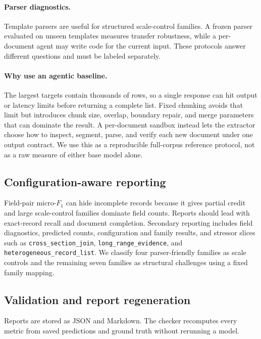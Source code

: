 \paragraph{Parser diagnostics.}
Template parsers are useful for structured scale-control families. A frozen parser evaluated on unseen templates measures transfer robustness, while a per-document agent may write code for the current input. These protocols answer different questions and must be labeled separately.

\paragraph{Why use an agentic baseline.}
The largest targets contain thousands of rows, so a single response can hit output or latency limits before returning a complete list. Fixed chunking avoids that limit but introduces chunk size, overlap, boundary repair, and merge parameters that can dominate the result. A per-document sandbox instead lets the extractor choose how to inspect, segment, parse, and verify each new document under one output contract. We use this as a reproducible full-corpus reference protocol, not as a raw measure of either base model alone.

\subsection{Configuration-aware reporting}
Field-pair micro-$F_1$ can hide incomplete records because it gives partial credit and large scale-control families dominate field counts. Reports should lead with exact-record recall and document completion. Secondary reporting includes field diagnostics, predicted counts, configuration and family results, and stressor slices such as \texttt{cross\_\hspace{0pt}section\_\hspace{0pt}join}, \texttt{long\_\hspace{0pt}range\_\hspace{0pt}evidence}, and \texttt{heterogeneous\_\hspace{0pt}record\_\hspace{0pt}list}. We classify four parser-friendly families as scale controls and the remaining seven families as structural challenges using a fixed family mapping.

\subsection{Validation and report regeneration}
Reports are stored as JSON and Markdown. The checker recomputes every metric from saved predictions and ground truth without rerunning a model.

